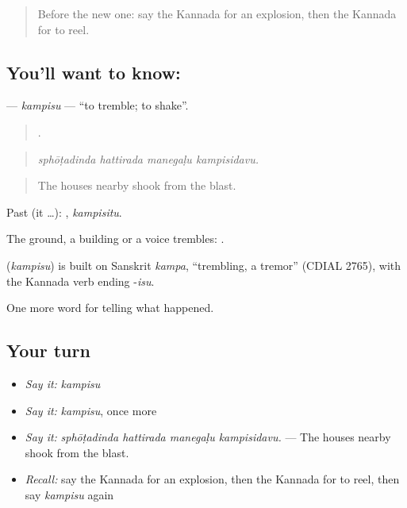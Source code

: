 \label{lesson:KA-C346-kampisu}



\begin{quote}
Before the new one: say the Kannada for an explosion, then the Kannada for to reel.
\end{quote}

\subsection*{You'll want to know: }
\textbf{} — \emph{kampisu} — \textquotedblleft{}to tremble; to shake\textquotedblright{}.

\begin{quote}
   .
\end{quote}

\begin{quote}
\emph{sphōṭadinda hattirada manegaḷu kampisidavu.}
\end{quote}

\begin{quote}
The houses nearby shook from the blast.
\end{quote}

Past (it …): , \emph{kampisitu}.

The ground, a building or a voice trembles:  .

\begin{cousinweb}
\textbf{} (\emph{kampisu}) is built on Sanskrit \emph{kampa}, \textquotedblleft{}trembling, a tremor\textquotedblright{} (CDIAL 2765), with the Kannada verb ending -\emph{isu}.
\end{cousinweb}

\begin{grammarlens}[title={What you've built}]
One more word for telling what happened.
\end{grammarlens}

\subsection*{Your turn}
\begin{itemize}
\raggedright
  \item \emph{Say it:} \emph{kampisu}
  \item \emph{Say it:} \emph{kampisu}, once more
  \item \emph{Say it:} \emph{sphōṭadinda hattirada manegaḷu kampisidavu.} — The houses nearby shook from the blast.
  \item \emph{Recall:} say the Kannada for an explosion, then the Kannada for to reel, then say \emph{kampisu} again
\end{itemize}

